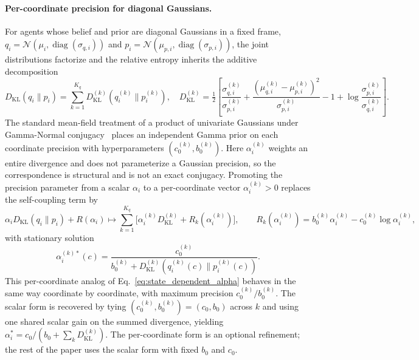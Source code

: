 \paragraph{Per-coordinate precision for diagonal Gaussians.}
\label{par:per_coord_alpha}
For agents whose belief and prior are diagonal Gaussians in a fixed frame, $q_i = \mathcal{N}(\mu_i, \operatorname{diag}(\sigma_{q,i}))$ and $p_i = \mathcal{N}(\mu_{p,i}, \operatorname{diag}(\sigma_{p,i}))$, the joint distributions factorize and the relative entropy inherits the additive decomposition
\begin{equation}
D_{\mathrm{KL}}(q_i \| p_i) = \sum_{k=1}^{K_q} D_{\mathrm{KL}}^{(k)}(q_i^{(k)} \| p_i^{(k)}),
\quad
D_{\mathrm{KL}}^{(k)} = \tfrac{1}{2}\left[ \frac{\sigma_{q,i}^{(k)}}{\sigma_{p,i}^{(k)}} + \frac{(\mu_{q,i}^{(k)} - \mu_{p,i}^{(k)})^2}{\sigma_{p,i}^{(k)}} - 1 + \log \frac{\sigma_{p,i}^{(k)}}{\sigma_{q,i}^{(k)}} \right].
\label{eq:kl_decomposition_per_coord}
\end{equation}
The standard mean-field treatment of a product of univariate Gaussians under Gamma-Normal conjugacy~\cite[\S 10.1.3, \S 2.3.6]{Bishop2006} places an independent Gamma prior on each coordinate precision with hyperparameters $(c_0^{(k)}, b_0^{(k)})$. Here $\alpha_i^{(k)}$ weights an entire divergence and does not parameterize a Gaussian precision, so the correspondence is structural and is not an exact conjugacy. Promoting the precision parameter from a scalar $\alpha_i$ to a per-coordinate vector $\alpha_i^{(k)} > 0$ replaces the self-coupling term by
\begin{equation}
\alpha_i  D_{\mathrm{KL}}(q_i \| p_i) + R(\alpha_i)
\longmapsto
\sum_{k=1}^{K_q} \Big[\alpha_i^{(k)} D_{\mathrm{KL}}^{(k)} + R_k(\alpha_i^{(k)})\Big],
\qquad
R_k(\alpha_i^{(k)}) = b_0^{(k)} \alpha_i^{(k)} - c_0^{(k)} \log \alpha_i^{(k)},
\label{eq:adaptive_self_coupling_per_coord}
\end{equation}
with stationary solution
\begin{equation}
\boxed{
\alpha_i^{(k)*}(c) = \frac{c_0^{(k)}}{b_0^{(k)} + D_{\mathrm{KL}}^{(k)}(q_i^{(k)}(c) \| p_i^{(k)}(c))}.
}
\label{eq:state_dependent_alpha_per_coord}
\end{equation}
This per-coordinate analog of Eq.~\eqref{eq:state_dependent_alpha} behaves in the same way coordinate by coordinate, with maximum precision $c_0^{(k)}/b_0^{(k)}$. The scalar form is recovered by tying $(c_0^{(k)}, b_0^{(k)}) = (c_0, b_0)$ across $k$ and using one shared scalar gain on the summed divergence, yielding $\alpha_i^* = c_0 / (b_0 + \sum_k D_{\mathrm{KL}}^{(k)})$. The per-coordinate form is an optional refinement; the rest of the paper uses the scalar form with fixed $b_0$ and $c_0$.

